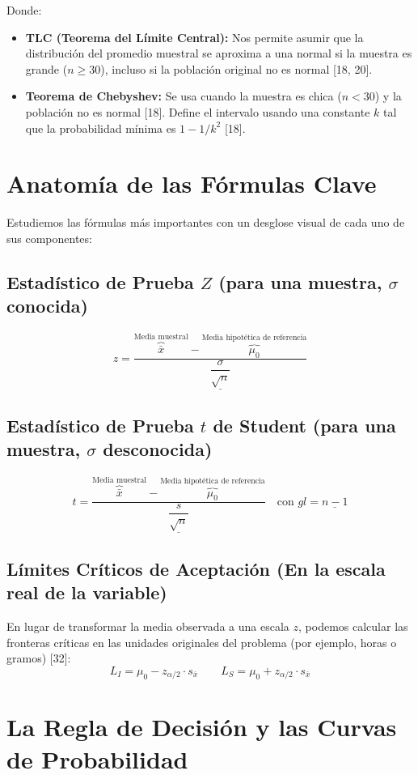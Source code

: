 \documentclass{article}
\begin{document}
Donde:
\begin{itemize}
    \item \textbf{TLC (Teorema del Límite Central):} Nos permite asumir que la distribución del promedio muestral se aproxima a una normal si la muestra es grande ($n \ge 30$), incluso si la población original no es normal [18, 20].
    \item \textbf{Teorema de Chebyshev:} Se usa cuando la muestra es chica ($n < 30$) y la población no es normal [18]. Define el intervalo usando una constante $k$ tal que la probabilidad mínima es $1 - 1/k^2$ [18].
\end{itemize}

\section{Anatomía de las Fórmulas Clave}

Estudiemos las fórmulas más importantes con un desglose visual de cada uno de sus componentes:

\subsection{Estadístico de Prueba $Z$ (para una muestra, $\sigma$ conocida)}
\[
z = \frac{ \overbrace{\bar{x}}^{\text{Media muestral}} - \overbrace{\mu_0}^{\text{Media hipotética de referencia}} }{ \underline{\dfrac{\sigma}{\sqrt{n}}} }
\]

\subsection{Estadístico de Prueba $t$ de Student (para una muestra, $\sigma$ desconocida)}
\[
t = \frac{ \overbrace{\bar{x}}^{\text{Media muestral}} - \overbrace{\mu_0}^{\text{Media hipotética de referencia}} }{ \underline{\dfrac{s}{\sqrt{n}}} } \quad \text{con } gl = \underline{n - 1}
\]

\subsection{Límites Críticos de Aceptación (En la escala real de la variable)}
En lugar de transformar la media observada a una escala $z$, podemos calcular las fronteras críticas en las unidades originales del problema (por ejemplo, horas o gramos) [32]:
\[
L_I = \mu_0 - z_{\alpha/2} \cdot s_{\bar{x}} \qquad L_S = \mu_0 + z_{\alpha/2} \cdot s_{\bar{x}}
\]

\newpage
\section{La Regla de Decisión y las Curvas de Probabilidad}
\end{document}
